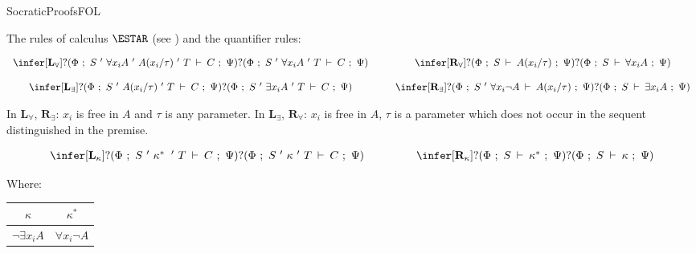 \begin{entry}{SocraticProofsFOL}  

\begin{calculus}

The rules of calculus $\ESTAR$ (see ) and the quantifier rules:

\[
\begin{array}{ccc}

\infer[\textbf{L}_{\forall}]{?(\Phi ~;~ S ~'~ \forall x_{i}A ~'~ A(x_{i}/\tau) ~'~ T\:\vdash\: C ~;~ \Psi)}{?(\Phi ~;~  S ~'~ \forall x_{i}A ~'~ T\:\vdash\: C ~;~ \Psi)}

&~~&

\infer[\textbf{R}_{\forall}]{?(\Phi ~;~  S\:\vdash\: A(x_{i}/\tau) ~;~ \Psi)}{?(\Phi ~;~  S\:\vdash\:\forall x_{i}A ~;~ \Psi)}

\\

&& \\

\infer[\textbf{L}_{\exists}]{?(\Phi ~;~  S ~'~ A(x_{i}/\tau) ~'~ T\:\vdash\: C ~;~ \Psi)}{?(\Phi ~;~  S ~'~ \exists x_{i}A ~'~ T\:\vdash\: C ~;~ \Psi)}

&~~&

\infer[\textbf{R}_{\exists}]{?(\Phi ~;~  S ~'~ \forall x_{i}\neg A\:\vdash\: A(x_{i}/\tau) ~;~ \Psi)}{?(\Phi ~;~  S\:\vdash\:\exists x_{i}A ~;~ \Psi)}

\\
\end{array}
\]

In $\textbf{L}_{\forall}$, $\textbf{R}_{\exists}$: $x_i$ is free in $A$ and $\tau$ is any parameter. In $\textbf{L}_{\exists}$, $\textbf{R}_{\forall}$: $x_i$ is free in $A$, $\tau$ is a parameter which does not occur in the sequent distinguished in the premise.

\[
\begin{array}{ccc}
\infer[\textbf{L}_{\kappa}]{?(\Phi ~;~  S ~'~\kappa^{*}\:~'~ T\:\vdash\: C ~;~ \Psi)}{?(\Phi ~;~  S ~'~ \kappa ~'~ T\:\vdash\: C ~;~ \Psi)}

&~~~~~~~~&

\infer[\textbf{R}_{\kappa}]{?(\Phi ~;~  S\:\vdash\:\kappa^{*} ~;~ \Psi)}{?(\Phi ~;~  S\:\vdash\:\kappa ~;~ \Psi)}
\end{array}
\]

Where:

\begin{center}

	\begin{tabular}{c|c}
			\hline
$\kappa$ & $\kappa^{*}$   \\ 
			\hline
$\neg\exists x_{i}A$ & $\forall x_{i}\neg A$  \\
			

\end{tabular}
\end{center}
\end{calculus}
\end{entry}
